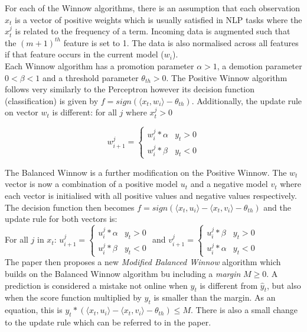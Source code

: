 \documentclass{article}
\begin{document}
For each of the Winnow algorithms, there is an assumption that each observation \(x_{t}\) is a vector of positive weights which is usually satisfied
in NLP tasks where the \(x_{t}^{j}\) is related to the frequency of a term. Incoming data is augmented such that the \((m+1)^{th}\) feature is set to 
1. The data is also normalised across all features if that feature occurs in the current model (\(w_{i}\)).\\

Each Winnow algorithm has a promotion parameter \(\alpha > 1\), a demotion parameter \(0 < \beta < 1\) and a threshold parameter \(\theta_{th} > 0\).
The Positive Winnow algorithm follows very similarly to the Perceptron however its decision function (classification) is given by
\(f = sign(\langle x_{t}, w_{i} \rangle - \theta_{th})\). Additionally, the update rule on vector \(w_{t}\) is different: 
for all \(j\) where \(x_{t}^{j} > 0\)

\[ w_{i+1}^{j} =
    \begin{cases} 
        w_{i}^{j} * \alpha & y_{t} > 0 \\
        w_{i}^{j} * \beta & y_{t} < 0
     \end{cases}
\]

The Balanced Winnow is a further modification on the Positive Winnow. The \(w_{t}\) vector is now a combination of a positive model \(u_{t}\) and
a negative model \(v_{t}\) where each vector is initialised with all positive values and negative values respectively. The decision function then becomes 
\(f = sign(\langle x_{t}, u_{i} \rangle - \langle x_{t}, v_{i} \rangle - \theta_{th})\) and the update rule for both vectors is:\\

For all \(j\) in \(x_{t}\): \( 
    u_{i+1}^{j} =
    \begin{cases} 
        u_{i}^{j} * \alpha & y_{t} > 0 \\
        u_{i}^{j} * \beta & y_{t} < 0
    \end{cases}
\)    and     \(
    v_{i+1}^{j} = \begin{cases} 
        u_{i}^{j} * \beta & y_{t} > 0 \\
        u_{i}^{j} * \alpha & y_{t} < 0
     \end{cases}
\)\\

The paper then proposes a new \emph{Modified Balanced Winnow} algorithm which builds on the Balanced Winnow algorithm bu including a \emph{margin} \(M \geq 0\). A prediction is considered 
a mistake not online when \(y_{t}\) is different from \(\hat{y}_{t}\), but also when the score function multiplied by \(y_{t}\) is smaller
than the margin. As an equation, this is \(y_{t}*(\langle x_{t}, u_{i} \rangle - \langle x_{t}, v_{i} \rangle - \theta_{th}) \leq M\).
There is also a small change to the update rule which can be referred to in the paper.
\end{document}
